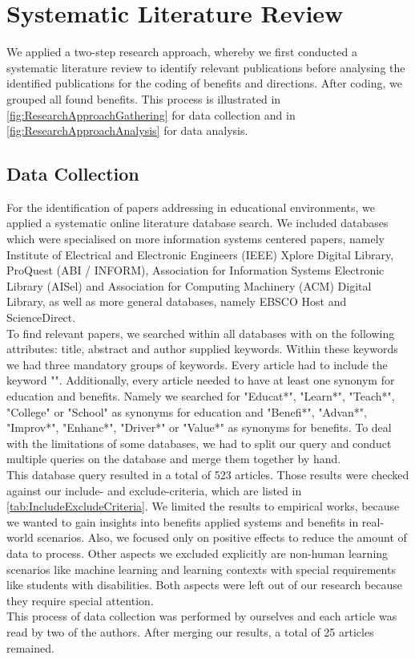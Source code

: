 \section{Systematic Literature Review}
We applied a two-step research approach, whereby we first conducted a systematic literature review to identify relevant publications before analysing the identified publications for the coding of benefits and directions. After coding, we grouped all found benefits. This process is illustrated in \ref{fig:ResearchApproachGathering} for data collection and in \ref{fig:ResearchApproachAnalysis} for data analysis.

\subsection{Data Collection}
For the identification of papers addressing \AR in educational environments, we applied a systematic online literature database search. We included databases which were specialised on more information systems centered papers, namely Institute of Electrical and Electronic Engineers (IEEE) Xplore Digital Library, ProQuest (ABI / INFORM), Association for Information Systems Electronic Library (AISel) and Association for Computing Machinery (ACM) Digital Library, as well as more general databases, namely EBSCO Host and ScienceDirect.\\
To find relevant papers, we searched within all databases with on the following attributes: title, abstract and author supplied keywords. Within these keywords we had three mandatory groups of keywords. Every article had to include the keyword "\AR". Additionally, every article needed to have at least one synonym for education and benefits. Namely we searched for "Educat*", "Learn*", "Teach*", "College" or "School" as synonyms for education and "Benefi*", "Advan*", "Improv*", "Enhanc*", "Driver*" or "Value*" as synonyms for benefits. To deal with the limitations of some databases, we had to split our query and conduct multiple queries on the database and merge them together by hand.\\
This database query resulted in a total of 523 articles. Those results were checked against our include- and exclude-criteria, which are listed in \ref{tab:IncludeExcludeCriteria}. We limited the results to empirical works, because we wanted to gain insights into benefits applied systems and benefits in real-world scenarios. Also, we focused only on positive effects to reduce the amount of data to process. Other aspects we excluded explicitly are non-human learning scenarios like machine learning and learning contexts with special requirements like students with disabilities. Both aspects were left out of our research because they require special attention. \\
This process of data collection was performed by ourselves and each article was read by two of the authors. After merging our results, a total of 25 articles remained.

